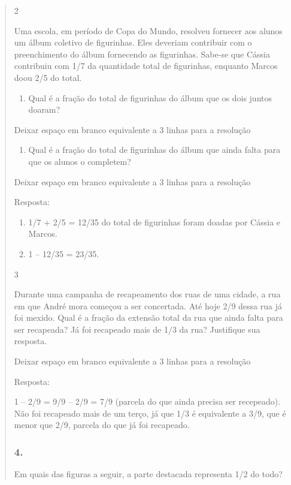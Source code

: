 \begin{mdframed}[linewidth=2pt,linecolor=salmao,roundcorner=2pt]
\begin{itemize}
{\begin{itemize}
\begin{escolha}
{\begin{quote}
{\begin{escolha}
{{{{\num{2}

Uma escola, em período de Copa do Mundo, resolveu fornecer aos alunos um
álbum coletivo de figurinhas. Eles deveriam contribuir com o
preenchimento do álbum fornecendo as figurinhas. Sabe-se que Cássia
contribuiu com 1/7 da quantidade total de figurinhas, enquanto Marcos
doou 2/5 do total.

\begin{enumerate}
\item
  Qual é a fração do total de figurinhas do álbum que os dois juntos doaram?
\end{enumerate}

Deixar espaço em branco equivalente a 3 linhas para a resolução

\begin{enumerate}
\item
  Qual é a fração do total de figurinhas do álbum que ainda falta para que os
  alunos o completem?
\end{enumerate}

Deixar espaço em branco equivalente a 3 linhas para a resolução

Resposta:

\begin{enumerate}
\item
  1/7 + 2/5 = 12/35 do total de figurinhas foram doadas por Cássia e
  Marcos.
\item
  1 -- 12/35 = 23/35.
\end{enumerate}

\num{3}

Durante uma campanha de recapeamento dos ruas de uma cidade, a rua em
que André mora começou a ser concertada. Até hoje 2/9 dessa rua já foi mexido.
Qual é a fração da extensão total da rua que ainda falta para ser
recapeada? Já foi recapeado mais de 1/3 da rua? Justifique sua resposta.

Deixar espaço em branco equivalente a 3 linhas para a resolução

Resposta:

1 -- 2/9 = 9/9 -- 2/9 = 7/9 (parcela do que ainda precisa ser recepeado).
Não foi recapeado mais de um terço, já que 1/3 é equivalente a 3/9, que é menor que 2/9, parcela do que já foi recapeado.

\subsubsection{4. }

Em quais das figuras a seguir, a parte destacada representa 1/2 do todo?

}}}}
\end{escolha}}
\end{quote}}
\end{escolha}
\end{itemize}}
\end{itemize}
\end{mdframed}

